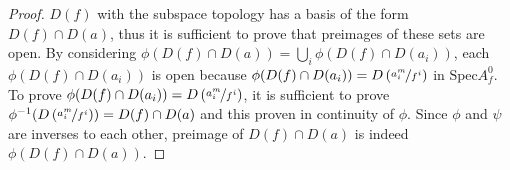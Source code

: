 \documentclass[a4paper,UKenglish,cleveref, autoref, thm-restate]{lipics-v2021}
\begin{document}
\begin{proof}
    ${D(f)}$ with the subspace topology has a basis of the form $D(f)\cap D(a)$, thus it is sufficient to prove that preimages of these sets are open. By considering $\phi(D(f)\cap D(a))=\bigcup_i \phi(D(f)\cap D(a_i))$, each $\phi(D(f)\cap D(a_i))$ is open because $\phi(D(f)\cap D(a_i))=D\left(\nicefrac{a_i^m}{f^i}\right)$ in $\mathrm{Spec} A^0_f$. To prove $\phi(D(f)\cap D(a_i))=D\left(\nicefrac{a_i^m}{f^i}\right)$, it is sufficient to prove $\phi^{-1}(D\left(\nicefrac{a_i^m}{f^i}\right))=D(f)\cap D(a)$ and this proven in continuity of $\phi$. Since $\phi$ and $\psi$ are inverses to each other, preimage of $D(f)\cap D(a)$ is indeed $\phi(D(f)\cap D(a))$.
\end{proof}
\end{document}
